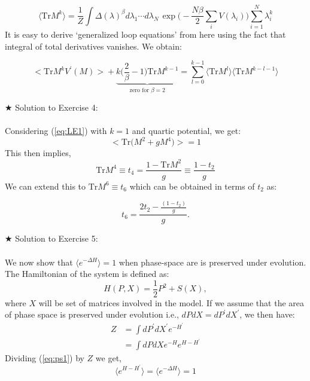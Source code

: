 \documentclass[11pt]{article}
\begin{document}
\begin{equation} 
\langle \mbox{Tr} M^k  \rangle = \frac{1}{Z} \int \Delta(\lambda)^{\beta} 
	d\lambda_1 \cdots d\lambda_{N~} \exp\Bigg(-\frac{N\beta}{2} \sum_{i} V(\lambda_{i})\Bigg)  \sum_{i=1}^{N} \lambda_{i}^k
\end{equation}
It is easy to derive `generalized loop equations' from here using the fact that integral 
of total derivatives vanishes. We obtain:

\begin{equation}
		\Big< \mathrm{Tr} M^{k} V^{\prime}(M) \Big> +  \underbrace{k \Bigg(\frac{2}{\beta} - 1 \Bigg) \mathrm{Tr} M^{k-1}}_{\text{zero for $\beta=2$}} = \sum_{l=0}^{k-1} \langle \mathrm{Tr} M^{l} \rangle  \langle \mathrm{Tr} M^{k-l-1} \rangle
\end{equation}
 

\noindent $\bigstar$ Solution to Exercise 4:
\\ \\ Considering (\ref{eq:LE1}) with $k=1$ and quartic potential, we get: 
    \begin{equation}
    \Big< \mathrm{Tr}\Big(M^{2} + g M^{4}\Big) \Big> = 1 
    \end{equation}
    This then implies, 
     \begin{equation}
     \mathrm{Tr} M^{4} \equiv t_{4} = \frac{1 - \mathrm{Tr} M^{2}}{g} \equiv \frac{1 - t_2}{g} 
     \end{equation}
     We can extend this to $\mathrm{Tr} M^{6} \equiv t_{6}$ which can be obtained in terms of 
     $t_2$ as:  
     
     \begin{equation}
     	t_{6} = \frac{2t_{2} - \frac{(1-t_{2})}{g}}{g}. 
     \end{equation} 

\noindent $\bigstar$ Solution to Exercise 5:
\\ \\ We now show that $ \langle e^{-\Delta H} \rangle = 1$ when phase-space are is preserved under evolution. The Hamiltonian of the system is defined as:
\begin{equation}
	H(P,X) = \frac{1}{2}P^2  + S(X), 
\end{equation} 
where $X$ will be set of matrices involved in the model. If we assume that the area of phase space is preserved under evolution i.e., $dP dX = dP^{\prime} dX^{\prime}$, we then have:
\begin{align}
	\label{eq:ps1} 
	Z &= \int dP^{\prime} dX^{\prime} e^{-H^{\prime} \nonumber }  \\
	&=  \int dP dX e^{-H} e^{H-H^{\prime}}
\end{align}
Dividing (\ref{eq:ps1}) by $Z$ we get, 
\begin{equation}
	\langle e^{H-H^{\prime}} \rangle = 	\langle e^{-\Delta H} \rangle = 1
\end{equation}
\end{document}
